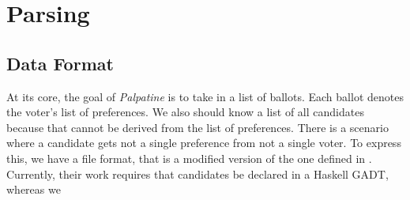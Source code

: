 \section{Parsing}

\subsection{Data Format}

At its core, the goal of \textit{Palpatine} is to take in a list of ballots.
Each ballot denotes the voter's list of preferences. We also should know a list
of all candidates because that cannot be derived from the list of preferences.
There is a scenario where a candidate gets not a single preference from not a
single voter. To express this, we have a file format, that is a modified version
of the one defined in \cite{stv_haskell}. Currently, their work requires that
candidates be declared in a Haskell GADT, whereas we 
